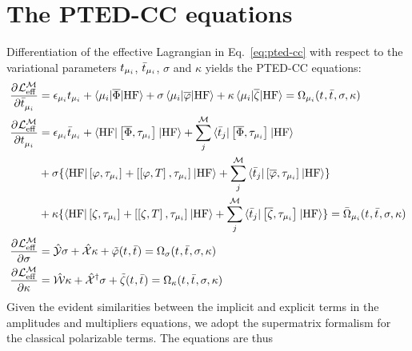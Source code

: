 \section{The PTED-CC equations}\label{sec:pted-cc-equations}

Differentiation of the effective Lagrangian in Eq.~\eqref{eq:pted-cc}
with respect to the variational parameters $t_{\mu_i}$,
$\bar{t}_{\mu_i}$, $\sigma$ and $\kappa$ yields the \acs{PTED}-\acs{CC}
equations:
\begin{equation}
  \begin{aligned}
   \frac{\partial^{}\mathcal{L}^\mathcal{M}_\mathrm{eff}} {\partial \bar{t}_{\mu_i}^{}} &=
   \epsilon_{\mu_i}t_{\mu_i} + \braket{\mu_i | \overline{\Phi} | \mathrm{HF}}
    + \sigma\braket{\mu_i | \overline{\varphi} | \mathrm{HF}}
    + \kappa\braket{\mu_i | \overline{\zeta} | \mathrm{HF}}
    = \Omega_{\mu_i}(t_{}, \bar{t}_{}, \sigma, \kappa) \\
    \frac{\partial^{}\mathcal{L}^\mathcal{M}_\mathrm{eff}} {\partial t_{\mu_i}^{}} &=
    \epsilon_{\mu_i}\bar{t}_{\mu_i} +
    \braket{\mathrm{HF} | \left[ \overline{\Phi}, \tau_{\mu_i} \right]^{} | \mathrm{HF}} +
    \sum_{j}^{\mathcal{M}}\braket{\bar{t}_{j} | \left[ \overline{\Phi}, \tau_{\mu_i} \right]^{} | \mathrm{HF}} \\
    &+ \sigma\lbrace
    \braket{\mathrm{HF} | \left[ \varphi, \tau_{\mu_i} \right]^{} +
    \left[ \left[ \varphi, T \right]^{}, \tau_{\mu_i} \right]^{}| \mathrm{HF}} +
    \sum_{j}^{\mathcal{M}}\braket{\bar{t}_{j} | \left[ \overline{\varphi}, \tau_{\mu_i} \right]^{} | \mathrm{HF}}
             \rbrace
             \\
    &+ \kappa\lbrace
    \braket{\mathrm{HF} | \left[ \zeta, \tau_{\mu_i} \right]^{} +
    \left[ \left[ \zeta, T \right]^{}, \tau_{\mu_i} \right]^{}| \mathrm{HF}} +
    \sum_{j}^{\mathcal{M}}\braket{\bar{t}_{j} | \left[ \overline{\zeta}, \tau_{\mu_i} \right]^{} | \mathrm{HF}}
             \rbrace
    = \bar{\Omega}_{\mu_i}(t_{}, \bar{t}_{}, \sigma, \kappa) \\
    \frac{\partial^{}\mathcal{L}^\mathcal{M}_\mathrm{eff}} {\partial \sigma^{}} &= \hat{\mathcal{Y}}\sigma + \hat{\mathcal{X}}\kappa
    + \tilde{\varphi}(t_{},\bar{t}_{}) =
    \Omega_\sigma(t_{}, \bar{t}_{}, \sigma, \kappa) \\
    \frac{\partial^{}\mathcal{L}^\mathcal{M}_\mathrm{eff}} {\partial \kappa^{}} &= \hat{\mathcal{W}}\kappa + \hat{\mathcal{X}}^\dagger\sigma + \tilde{\zeta}(t_{},\bar{t}_{}) =
    \Omega_\kappa(t_{}, \bar{t}_{}, \sigma, \kappa)
  \end{aligned}
\end{equation}
Given the evident similarities between the implicit and explicit terms
in the amplitudes and multipliers equations, we adopt the supermatrix
formalism for the classical polarizable terms. The equations are thus
